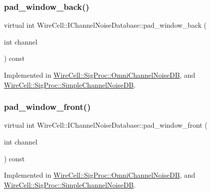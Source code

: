 \subsubsection{\texorpdfstring{pad\+\_\+window\+\_\+back()}{pad\_window\_back()}}
{\footnotesize\ttfamily virtual int Wire\+Cell\+::\+I\+Channel\+Noise\+Database\+::pad\+\_\+window\+\_\+back (\begin{DoxyParamCaption}\item[{int}]{channel }\end{DoxyParamCaption}) const\hspace{0.3cm}{\ttfamily [pure virtual]}}



Implemented in \hyperlink{class_wire_cell_1_1_sig_proc_1_1_omni_channel_noise_d_b_ac765001725b5a181ccfd605d0221e0ef}{Wire\+Cell\+::\+Sig\+Proc\+::\+Omni\+Channel\+Noise\+DB}, and \hyperlink{class_wire_cell_1_1_sig_proc_1_1_simple_channel_noise_d_b_a4643919d65336ba0090213d772bb6bf9}{Wire\+Cell\+::\+Sig\+Proc\+::\+Simple\+Channel\+Noise\+DB}.

\mbox{\label{class_wire_cell_1_1_i_channel_noise_database_a77f82280942595e1a2506f49a6f76f56}} 
\subsubsection{\texorpdfstring{pad\+\_\+window\+\_\+front()}{pad\_window\_front()}}
{\footnotesize\ttfamily virtual int Wire\+Cell\+::\+I\+Channel\+Noise\+Database\+::pad\+\_\+window\+\_\+front (\begin{DoxyParamCaption}\item[{int}]{channel }\end{DoxyParamCaption}) const\hspace{0.3cm}{\ttfamily [pure virtual]}}



Implemented in \hyperlink{class_wire_cell_1_1_sig_proc_1_1_omni_channel_noise_d_b_afc69ca596a5ff6f8a63fc64234c8062e}{Wire\+Cell\+::\+Sig\+Proc\+::\+Omni\+Channel\+Noise\+DB}, and \hyperlink{class_wire_cell_1_1_sig_proc_1_1_simple_channel_noise_d_b_a5c1e58cf0586ac32c1e6d3810606a992}{Wire\+Cell\+::\+Sig\+Proc\+::\+Simple\+Channel\+Noise\+DB}.

